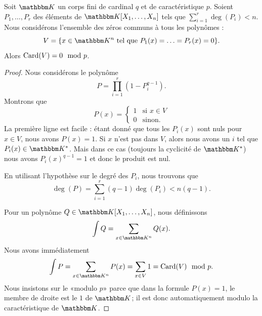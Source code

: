 \begin{theorem}        \label{ThoLTcYKk}
    Soit \( \eK\) un corps fini de cardinal \( q\) et de caractéristique \( p\). Soient \( P_1,\ldots, P_r\) des éléments de \( \eK[X_1,\ldots, X_n]\) tels que \( \sum_{i=1}^r\deg(P_i)<n\). Nous considérons l'ensemble des zéros communs à tous les polynômes :
    \begin{equation}
        V=\{ x\in \eK^n\tq P_1(x)=\ldots=P_r(x)=0 \}.
    \end{equation}
    Alors \( \operatorname{Card}(V)=0\mod p\).
\end{theorem}

\begin{proof}
    Nous considérons le polynôme
    \begin{equation}
        P=\prod_{i=1}^r(1-P_i^{q-1}).
    \end{equation}
    Montrons que
    \begin{equation}
        P(x)=\begin{cases}
            1    &   \text{si } x\in V\\
            0    &    \text{sinon}.
        \end{cases}
    \end{equation}
    La première ligne est facile : étant donné que tous les \( P_i(x)\) sont nuls pour \( x\in V\), nous avons \( P(x)=1\). Si \( x\) n'est pas dans \( V\), alors nous avons un \( i\) tel que \( P_i(x)\in \eK^*\). Mais dans ce cas (toujours la cyclicité de \( \eK^*\)) nous avons \( P_i(x)^{q-1}=1\) et donc le produit est nul.

    En utilisant l'hypothèse sur le degré des \( P_i\), nous trouvons que
    \begin{equation}
        \deg(P)=\sum_{i=1}^r(q-1)\deg(P_i)<n(q-1).
    \end{equation}

    Pour un polynôme \( Q\in \eK[X_1,\ldots, X_n]\), nous définissons
    \begin{equation}
        \int Q=\sum_{x\in \eK^n}Q(x).
    \end{equation}
    Nous avons immédiatement
    \begin{equation}
        \int P=\sum_{x\in \eK^n}P(x)=\sum_{x\in V}1=\Card(V)\mod p.
    \end{equation}
    Nous insistons sur le «modulo \( p\)» parce que dans la formule \( P(x)=1\), le membre de droite est le \( 1\) de \( \eK\); il est donc automatiquement modulo la caractéristique de \( \eK\).


\end{proof}
